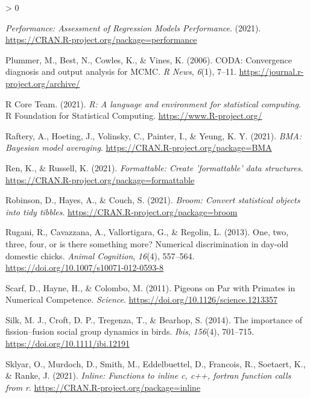 \documentclass[
  english,
  ,doc,floatsintext]{apa6}
\newlength{\cslhangindent}
\newenvironment{CSLReferences}[2] %
 {%
  \setlength{\parindent}{0pt}
  \ifodd #1 \everypar{\setlength{\hangindent}{\cslhangindent}}\ignorespaces\fi
  \ifnum #2 > 0
  \setlength{\parskip}{#2\baselineskip}
  \fi
 }%
 {}
\begin{document}
\begin{CSLReferences}{1}{0}
\leavevmode\hypertarget{ref-Ludeckestrengejacke.etal.2021}{}%
\emph{Performance: {Assessment} of {Regression} {Models} {Performance}}. (2021). \url{https://CRAN.R-project.org/package=performance}

\leavevmode\hypertarget{ref-R-coda}{}%
Plummer, M., Best, N., Cowles, K., \& Vines, K. (2006). CODA: Convergence diagnosis and output analysis for MCMC. \emph{R News}, \emph{6}(1), 7--11. \url{https://journal.r-project.org/archive/}

\leavevmode\hypertarget{ref-R-base}{}%
R Core Team. (2021). \emph{R: A language and environment for statistical computing}. R Foundation for Statistical Computing. \url{https://www.R-project.org/}

\leavevmode\hypertarget{ref-R-BMA}{}%
Raftery, A., Hoeting, J., Volinsky, C., Painter, I., \& Yeung, K. Y. (2021). \emph{BMA: Bayesian model averaging}. \url{https://CRAN.R-project.org/package=BMA}

\leavevmode\hypertarget{ref-R-formattable}{}%
Ren, K., \& Russell, K. (2021). \emph{Formattable: Create 'formattable' data structures}. \url{https://CRAN.R-project.org/package=formattable}

\leavevmode\hypertarget{ref-R-broom}{}%
Robinson, D., Hayes, A., \& Couch, S. (2021). \emph{Broom: Convert statistical objects into tidy tibbles}. \url{https://CRAN.R-project.org/package=broom}

\leavevmode\hypertarget{ref-Rugani.etal.2013}{}%
Rugani, R., Cavazzana, A., Vallortigara, G., \& Regolin, L. (2013). One, two, three, four, or is there something more? {Numerical} discrimination in day-old domestic chicks. \emph{Animal Cognition}, \emph{16}(4), 557--564. \url{https://doi.org/10.1007/s10071-012-0593-8}

\leavevmode\hypertarget{ref-Scarf.etal.2011}{}%
Scarf, D., Hayne, H., \& Colombo, M. (2011). Pigeons on {Par} with {Primates} in {Numerical} {Competence}. \emph{Science}. \url{https://doi.org/10.1126/science.1213357}

\leavevmode\hypertarget{ref-Silk.etal.2014}{}%
Silk, M. J., Croft, D. P., Tregenza, T., \& Bearhop, S. (2014). The importance of fission--fusion social group dynamics in birds. \emph{Ibis}, \emph{156}(4), 701--715. \url{https://doi.org/10.1111/ibi.12191}

\leavevmode\hypertarget{ref-R-inline}{}%
Sklyar, O., Murdoch, D., Smith, M., Eddelbuettel, D., Francois, R., Soetaert, K., \& Ranke, J. (2021). \emph{Inline: Functions to inline c, c++, fortran function calls from r}. \url{https://CRAN.R-project.org/package=inline}


\end{CSLReferences}
\end{document}
